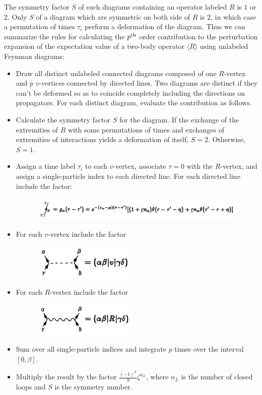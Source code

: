 \documentclass[12pt]{article}
\begin{document}
The symmetry factor $S$ of such diagrams containing an operator labeled $R$ is 
$1$ or $2$. Only $S$ of a diagram which are symmetric on both side of $R$ is 
$2$, in which case a permutation of times $\tau_i$ perform a deformation of 
the diagram. Thus we can summarize the rules for calculating the $p^{\rm th}$ 
order contribution to the perturbation expansion of the expectation value of a 
two-body operator $\langle R\rangle$ using unlabeled Feynman diagrams:
\begin{itemize}
    \item Draw all distinct unlabeled connected diagrams composed of one 
    $R$-vertex and $p$ $v$-vertices connected by directed lines. Two diagrams 
    are distinct if they can't be deformed so as to coincide completely 
    including the directions on propagators. For each distinct diagram, 
    evaluate the contribution as follows.
    \item Calculate the symmetry factor $S$ for the diagram. If the exchange 
    of the extremities of $R$ with some permutations of times and exchanges 
    of extremities of interactions yields a deformation of itself, $S=2$. 
    Otherwise, $S=1$.
    \item Assign a time label $\tau_i$ to each $v$-vertex, associate $\tau=0$ 
    with the $R$-vertex, and assign a single-particle index to each directed 
    line. For each directed line include the factor:
    \begin{figure}[H]
        \centering
        \includegraphics[width=15cm]{p3.png}
        \caption*{}
        \label{}
    \end{figure}
    \item For each $v$-vertex include the factor 
    \begin{figure}[H]
        \centering
        \includegraphics[width=5cm]{p12.png}
        \label{}
    \end{figure}
    \item For each $R$-vertex include the factor
    \begin{figure}[H]
        \centering
        \includegraphics[width=5cm]{p13.png}
        \label{}
    \end{figure}
    \item Sum over all single-particle indices and integrate $p$ times over 
    the interval $[0,\beta]$.
    \item Multiply the result by the factor $\frac{(-1)^p}{S}\zeta^{n_L}$, where 
    $n_L$ is the number of closed loops and $S$ is the symmetry number. 
\end{itemize} 
\end{document}
